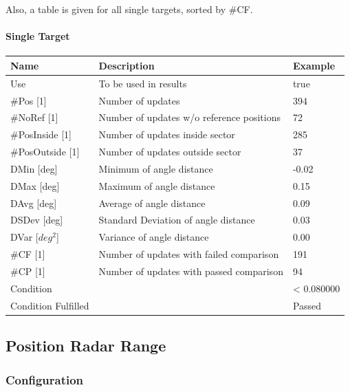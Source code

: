 Also, a table is given for all single targets, sorted by \#CF.

\paragraph{Single Target}

\begin{center}
 \begin{table}[H]
  \begin{tabularx}{\textwidth}{ | l | X |  l | }
    \hline
    \textbf{Name} & \textbf{Description} & \textbf{Example} \\ \hline
    Use & To be used in results & true \\ \hline
    \#Pos [1] & Number of updates & 394 \\ \hline
    \#NoRef [1] & Number of updates w/o reference positions & 72 \\ \hline
    \#PosInside [1] & Number of updates inside sector & 285 \\ \hline
    \#PosOutside [1] & Number of updates outside sector & 37 \\ \hline
    DMin [deg] & Minimum of angle distance & -0.02 \\ \hline
    DMax [deg] & Maximum of angle distance & 0.15 \\ \hline
    DAvg [deg] & Average of angle distance & 0.09 \\ \hline
    DSDev [deg] & Standard Deviation of angle distance & 0.03 \\ \hline
    DVar [$deg^2$] & Variance of angle distance & 0.00 \\ \hline
    \#CF [1] & Number of updates with failed comparison & 191 \\ \hline
    \#CP [1] & Number of updates with passed comparison & 94 \\ \hline
    Condition &  & < 0.080000 \\ \hline
    Condition Fulfilled &  & Passed \\ \hline
\end{tabularx}
\end{table}
\end{center}


\subsection{Position Radar Range}
\label{sec:eval_req_pos_radar_rng} 

\subsubsection{Configuration}

